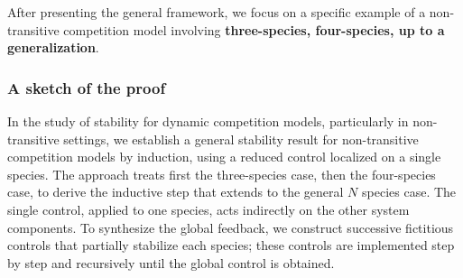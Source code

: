 \documentclass[10pt, a4paper]{amsart}
\theoremstyle{plain}
\theoremstyle{definition}
\theoremstyle{remark}
\newtheorem{remark}[lemma]{Remark}
\numberwithin{equation}{section}
\begin{document}


After presenting the general framework, we focus on a specific example of a non-transitive competition model involving {\bf three-species, four-species, up to a generalization}.\\
\subsubsection*{\bf A sketch of the proof}
In the study of stability for dynamic competition models, particularly in non-transitive settings, we establish a general stability result for non-transitive competition models by induction, using a reduced control localized on a single species. The approach treats first the three-species case, then the four-species case, to derive the inductive step that extends to the general $N$ species case.
The single control, applied to one species, acts indirectly on the other system components.%
To synthesize the global feedback, we construct successive fictitious controls that partially stabilize each species; these controls are implemented step by step and recursively until the global control is obtained.
\end{document}
